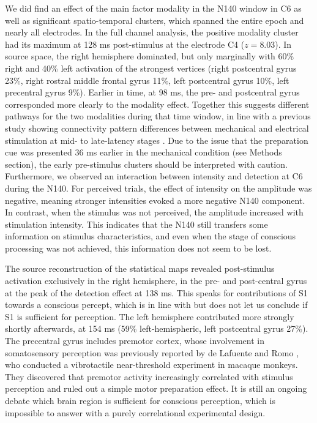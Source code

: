 \documentclass[11pt,a4paper,onecolumn]{article}
\begin{document}
We did find an effect of the main factor modality in the N140 window in C6 as well as significant spatio-temporal clusters, which spanned the entire epoch and nearly all electrodes. In the full channel analysis, the positive modality cluster had its maximum at 128 ms post-stimulus at the electrode C4 ($z = 8.03$). In source space, the right hemisphere dominated, but only marginally with 60\% right and 40\% left activation of the strongest vertices (right postcentral gyrus 23\%, right rostral middle frontal gyrus 11\%, left postcentral gyrus 10\%, left precentral gyrus 9\%). Earlier in time, at 98 ms, the pre- and postcentral gyrus corresponded more clearly to the modality effect.  Together this suggests different pathways for the two modalities during that time window, in line with a previous study showing connectivity pattern differences between mechanical and electrical stimulation at mid- to late-latency stages \cite{alouitCorticalActivationsInduced2025}. Due to the issue that the preparation cue was presented 36 ms earlier in the mechanical condition (see Methods section), the early pre-stimulus clusters should be interpreted with caution. 
Furthermore, we observed an interaction between intensity and detection at C6 during the N140.
For perceived trials, the effect of intensity on the amplitude was negative, meaning stronger intensities evoked a more negative N140 component. In contrast, when the stimulus was not perceived, the amplitude increased with stimulation intensity.  
This indicates that the N140 still transfers some information on stimulus characteristics, and even when the stage of conscious processing was not achieved, this information does not seem to be lost.
 
The source reconstruction of the statistical maps revealed post-stimulus activation exclusively in the right hemisphere, in the pre- and post-central gyrus at the peak of the detection effect at 138 ms. 
This speaks for contributions of S1 towards a conscious percept, which is in line with \cite{jonesNeuralCorrelatesTactile2007, auksztulewiczRecurrentNeuralProcessing2012, gwynneConsciousTactilePerception2026} but does not let us conclude if S1 is sufficient for perception. The left hemisphere contributed more strongly shortly afterwards, at 154 ms (59\% left-hemispheric, left postcentral gyrus 27\%). 
The precentral gyrus includes premotor cortex, whose involvement in somatosensory perception was previously reported by de Lafuente and Romo \cite{delafuenteNeuralCorrelateSubjective2006}, who conducted a vibrotactile near-threshold experiment in macaque monkeys. They discovered that premotor activity increasingly correlated with stimulus perception and ruled out a simple motor preparation effect. It is still an ongoing debate which brain region is sufficient for conscious perception, which is impossible to answer with a purely correlational experimental design.
\end{document}
